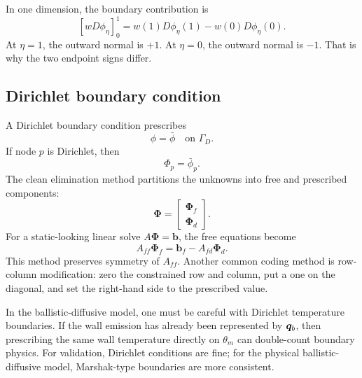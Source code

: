\documentclass[11pt]{article}
\begin{document}
In one dimension, the boundary contribution is
\begin{equation}
    \left[wD\phi_\eta\right]_0^1=w(1)D\phi_\eta(1)-w(0)D\phi_\eta(0).
\end{equation}
At \(\eta=1\), the outward normal is \(+1\). At \(\eta=0\), the outward normal is \(-1\). That is why the two endpoint signs differ.

\subsection{Dirichlet boundary condition}
A Dirichlet boundary condition prescribes
\begin{equation}
    \phi=\bar\phi\quad \text{on }\Gamma_D.
\end{equation}
If node \(p\) is Dirichlet, then
\begin{equation}
    \Phi_p=\bar\phi_p.
\end{equation}
The clean elimination method partitions the unknowns into free and prescribed components:
\begin{equation}
    \bm{\Phi}=\begin{bmatrix}\bm{\Phi}_f\\\bm{\Phi}_d\end{bmatrix}.
\end{equation}
For a static-looking linear solve \(A\bm{\Phi}=\bm{b}\), the free equations become
\begin{equation}
    A_{ff}\bm{\Phi}_f=\bm{b}_f-A_{fd}\bm{\Phi}_d.
\end{equation}
This method preserves symmetry of \(A_{ff}\). Another common coding method is row-column modification: zero the constrained row and column, put a one on the diagonal, and set the right-hand side to the prescribed value.

In the ballistic-diffusive model, one must be careful with Dirichlet temperature boundaries. If the wall emission has already been represented by \(\bm{q}_b\), then prescribing the same wall temperature directly on \(\theta_m\) can double-count boundary physics. For validation, Dirichlet conditions are fine; for the physical ballistic-diffusive model, Marshak-type boundaries are more consistent.
\end{document}
